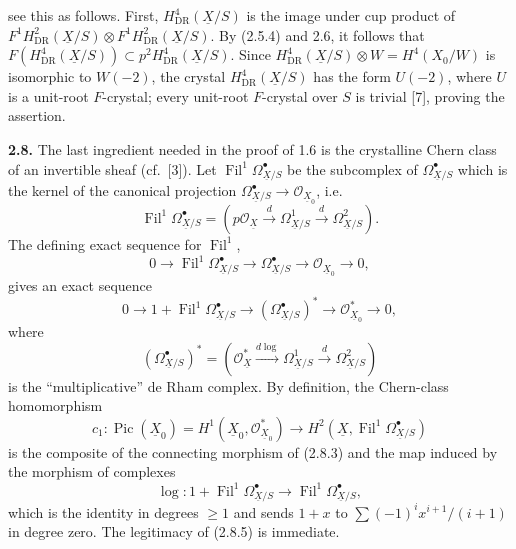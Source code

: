 \documentclass[10pt]{article}
\newcommand{\UX}{\underline{X}}
\begin{document}
see this as follows. First, $H^4_{\mathrm{DR}}(\UX/S)$ is the image under cup product of
$F^1H^2_{\mathrm{DR}}(\UX/S)\otimes F^1H^2_{\mathrm{DR}}(\UX/S)$. By (2.5.4) and 2.6, it follows that
$F(H^4_{\mathrm{DR}}(\UX/S))\subset p^2H^4_{\mathrm{DR}}(\UX/S)$. Since
$H^4_{\mathrm{DR}}(\UX/S)\otimes W=H^4(X_0/W)$ is isomorphic to $W(-2)$, the crystal $H^4_{\mathrm{DR}}(\UX/S)$ has the form $U(-2)$, where $U$ is a unit-root $F$-crystal; every unit-root $F$-crystal over $S$ is trivial [7], proving the assertion.

\noindent\textbf{2.8.} The last ingredient needed in the proof of 1.6 is the crystalline Chern class of an invertible sheaf (cf.~[3]). Let $\operatorname{Fil}^1\Omega^\bullet_{\UX/S}$ be the subcomplex of $\Omega^\bullet_{\UX/S}$ which is the kernel of the canonical projection $\Omega^\bullet_{\UX/S}\to\mathcal O_{\UX_0}$, i.e.
\begin{equation}\tag{2.8.1}
\operatorname{Fil}^1\Omega^\bullet_{\UX/S}
=(p\mathcal O_{\UX}\xrightarrow{d}\Omega^1_{\UX/S}\xrightarrow{d}\Omega^2_{\UX/S}).
\end{equation}
The defining exact sequence for $\operatorname{Fil}^1$,
\begin{equation}\tag{2.8.2}
0\longrightarrow\operatorname{Fil}^1\Omega^\bullet_{\UX/S}
\longrightarrow\Omega^\bullet_{\UX/S}\longrightarrow\mathcal O_{\UX_0}\longrightarrow0,
\end{equation}
gives an exact sequence
\begin{equation}\tag{2.8.3}
0\longrightarrow1+\operatorname{Fil}^1\Omega^\bullet_{\UX/S}
\longrightarrow(\Omega^\bullet_{\UX/S})^*\longrightarrow\mathcal O_{\UX_0}^*\longrightarrow0,
\end{equation}
where
\[
(\Omega^\bullet_{\UX/S})^*=(\mathcal O_{\UX}^*\xrightarrow{d\log}\Omega^1_{\UX/S}\xrightarrow{d}\Omega^2_{\UX/S})
\]
is the ``multiplicative'' de Rham complex. By definition, the Chern-class homomorphism
\begin{equation}\tag{2.8.4}
c_1:\operatorname{Pic}(\UX_0)=H^1(\UX_0,\mathcal O_{\UX_0}^*)
\longrightarrow H^2(\UX,\operatorname{Fil}^1\Omega^\bullet_{\UX/S})
\end{equation}
is the composite of the connecting morphism of (2.8.3) and the map induced by the morphism of complexes
\begin{equation}\tag{2.8.5}
\log:1+\operatorname{Fil}^1\Omega^\bullet_{\UX/S}
\longrightarrow\operatorname{Fil}^1\Omega^\bullet_{\UX/S},
\end{equation}
which is the identity in degrees $\ge1$ and sends
$1+x$ to $\sum(-1)^ix^{i+1}/(i+1)$ in degree zero. The legitimacy of (2.8.5) is immediate.
\newpage
\setcounter{footnote}{0}
\fontsize{10.2pt}{12.04pt}\selectfont
\end{document}
